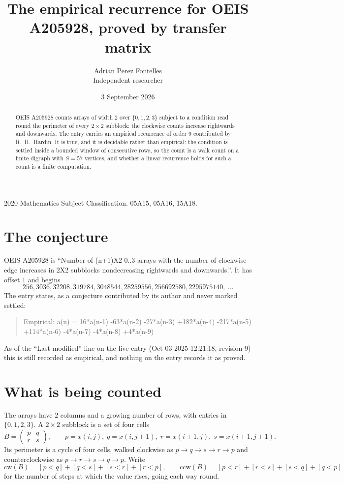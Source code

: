 \documentclass[11pt,a4paper]{article}
\title{The empirical recurrence for OEIS A205928, proved by transfer matrix}
\author{Adrian Perez Fontelles\\ \small Independent researcher}
\date{3 September 2026}
\theoremstyle{plain}
\theoremstyle{definition}
\begin{document}
\maketitle

\begin{abstract}
OEIS A205928 counts arrays of width $2$ over $\{0,1,2,3\}$ subject to a condition read round the
perimeter of every $2\times2$ subblock: the clockwise counts increase rightwards and downwards. The entry carries an empirical recurrence of
order $9$ contributed by R.~H.~Hardin. It is true, and it is decidable rather than
empirical: the condition is settled inside a bounded window of consecutive rows, so the
count is a walk count on a finite digraph with $S=57$ vertices, and whether a linear
recurrence holds for such a count is a finite computation.
\end{abstract}

\noindent\small 2020 Mathematics Subject Classification. 05A15, 05A16, 15A18.\normalsize

\section{The conjecture}

OEIS A205928 is ``Number of (n+1)X2 0..3 arrays with the number of clockwise edge increases in 2X2 subblocks nondecreasing rightwards and downwards.''. It has offset $1$ and begins
\[
256, 3036, 32208, 319784, 3048544, 28259556, 256692580, 2295975140,\ \dots
\]
The entry states, as a conjecture contributed by its author and never marked settled:
\begin{quote}
Empirical: a(n) = 16*a(n-1) -63*a(n-2) -27*a(n-3) +182*a(n-4) -217*a(n-5) +114*a(n-6) -4*a(n-7) -4*a(n-8) +4*a(n-9)
\end{quote}
As of the ``Last modified'' line on the live entry (Oct 03 2025 12:21:18, revision 9) this is still
recorded as empirical, and nothing on the entry records it as proved.

\section{What is being counted}

The arrays have $2$ columns and a growing number of rows, with entries in $\{0,1,2,3\}$. A
$2\times2$ subblock is a set of four cells
\[
B=\begin{pmatrix} p & q \\ r & s \end{pmatrix},
\qquad p=x(i,j),\; q=x(i,j+1),\; r=x(i+1,j),\; s=x(i+1,j+1).
\]
Its perimeter is a cycle of four cells, walked clockwise as $p\to q\to s\to r\to p$ and
counterclockwise as $p\to r\to s\to q\to p$. Write
\[
\mathrm{cw}(B)=[p<q]+[q<s]+[s<r]+[r<p],\qquad
\mathrm{ccw}(B)=[p<r]+[r<s]+[s<q]+[q<p]
\]
for the number of steps at which the value rises, going each way round.
\end{document}
